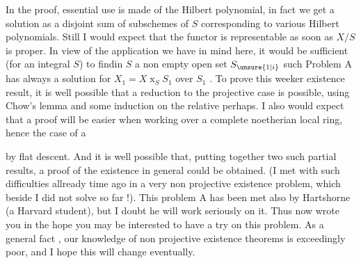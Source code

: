 In the proof, essential use is made of the Hilbert polynomial, in fact we get a solution as a disjoint sum of subschemes of $S$ corresponding to various Hilbert polynomials. Still I would expect that the  functor is representable as soon as $X/S$ is proper. In view of the application we have in mind here, it would be sufficient (for an integral $S$) to findin $S$ a non empty  open set $S_{\unsure{1|i}}$ such Problem A has always a solution for $X_1=X\mathbin{x}_S S_1$ over $S_1$ . To prove this weeker existence result, it is well possible that a reduction to the projective case is possible, using Chow's lemma and some induction on the relative  perhaps. I also would expect that a proof will be easier when working over a complete noetherian local ring, hence the case of a
\begin{minipage}[c]{4.7cm}
\end{minipage}
by flat descent. And it is well possible that, putting together two such partial results, a proof of the existence in general could be obtained. (I met with such difficulties allready time ago in a very  non projective existence problem, which beside I did not solve so far !). This problem A has been met also by Hartshorne (a Harvard student), but I doubt he will work seriously on it. Thus  now wrote you in the hope you may be interested to have a try on this problem. As a general fact , our knowledge of non projective existence theorems is exceedingly poor, and I hope this will change eventually.

